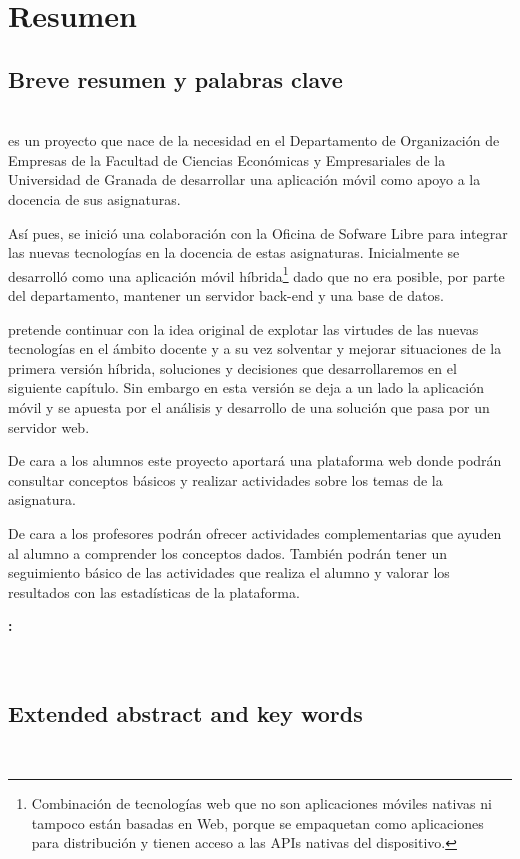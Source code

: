 \chapter{Resumen}

\section{Breve resumen y palabras clave}
\\


\bigskip
{\titulo} es un proyecto que nace de la necesidad en el Departamento de Organización de Empresas de la Facultad de Ciencias Económicas y Empresariales de la Universidad de Granada de desarrollar una aplicación móvil como apoyo a la docencia de sus asignaturas.

\bigskip
Así pues, se inició una colaboración con la Oficina de Sofware Libre para integrar las nuevas tecnologías en la docencia de estas asignaturas. Inicialmente se desarrolló como una aplicación móvil híbrida\footnote{Combinación de tecnologías web que no son aplicaciones móviles nativas ni tampoco están basadas en Web, porque se empaquetan como aplicaciones para distribución y tienen acceso a las APIs nativas del dispositivo.} dado que no era posible, por parte del departamento, mantener un servidor back-end y una base de datos.

\bigskip
{\titulo} pretende continuar con la idea original de explotar las virtudes de las nuevas tecnologías en el ámbito docente y a su vez solventar y mejorar situaciones de la primera versión híbrida, soluciones y decisiones que desarrollaremos en el siguiente capítulo. Sin embargo en esta versión se deja a un lado la aplicación móvil y se apuesta por el análisis y desarrollo de una solución  que pasa por un servidor web.

\bigskip
De cara a los alumnos este proyecto aportará una plataforma web donde podrán consultar conceptos básicos y realizar actividades sobre los temas de la asignatura.

\bigskip
De cara a los profesores podrán ofrecer actividades complementarias que ayuden al alumno a comprender los conceptos dados. También podrán tener un seguimiento básico de las actividades que realiza el alumno y valorar los resultados con las estadísticas de la plataforma.




\newpage
\begin{center}
{\LARGE\bfseries\tituloEng: }{\LARGE\bfseries\subtitulo}\\
\end{center}
\begin{center}
\autor\
\end{center}

\section{Extended abstract and key words}

\\
